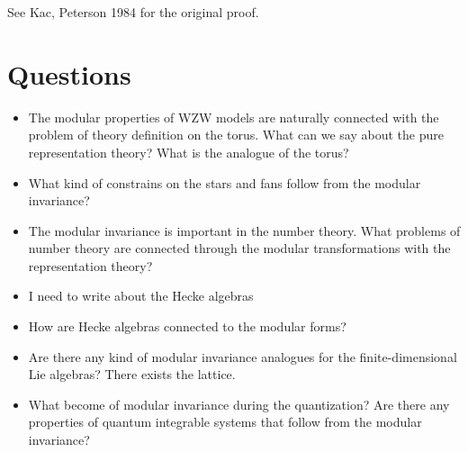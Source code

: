 \documentclass[a4paper,12pt]{article}
\theoremstyle{definition} \newtheorem{Def}{Definition}
\begin{document}
See Kac, Peterson 1984 for the original proof.
\section{Questions}
\label{sec:questions}
\begin{itemize}
\item The modular properties of WZW models are naturally connected with the problem of theory definition on the torus. What can we say about the pure representation theory? What is the analogue of the torus?
\item What kind of constrains on the stars and fans follow from the modular invariance?
\item The modular invariance is important in the number theory. What problems of number theory are connected through the modular transformations with the representation theory?
\item I need to write about the Hecke algebras
\item How are Hecke algebras connected to the modular forms?
\item Are there any kind of modular invariance analogues for the finite-dimensional Lie algebras? There exists the lattice.
\item What become of modular invariance during the quantization? Are there any properties of quantum integrable systems that follow from the modular invariance?
\end{itemize}

{}

\end{document}
